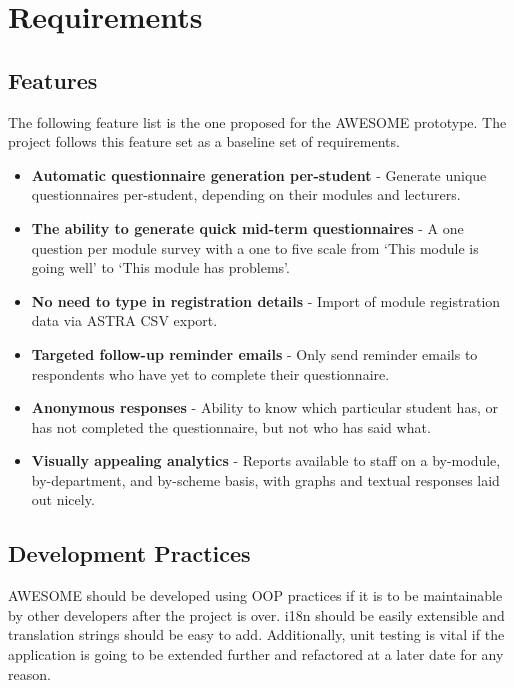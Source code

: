 \chapter{Requirements}

	\section{Features}
	
	The following feature list is the one proposed for the \ac{AWESOME} prototype.
	The project follows this feature set as a baseline set of requirements.
	
	\begin{itemize}
		\item \textbf{Automatic questionnaire generation per-student} - Generate unique questionnaires per-student, depending on their modules and lecturers.
		\item \textbf{The ability to generate quick mid-term questionnaires} - A one question per module survey with a one to five scale from `This module is going well' to `This module has problems'.
		\item \textbf{No need to type in registration details} - Import of module registration data via \ac{ASTRA} \ac{CSV} export.
		\item \textbf{Targeted follow-up reminder emails} - Only send reminder emails to respondents who have yet to complete their questionnaire.
		\item \textbf{Anonymous responses} - Ability to know which particular student has, or has not completed the questionnaire, but not who has said what.
		\item \textbf{Visually appealing analytics} - Reports available to staff on a by-module, by-department, and by-scheme basis, with graphs and textual responses laid out nicely.
	\end{itemize}

	\section{Development Practices}
	
	\ac{AWESOME} should be developed using \ac{OOP} practices if it is to be maintainable by other developers after the project is over.
	\acl{i18n} should be easily extensible and translation strings should be easy to add.
	Additionally, unit testing is vital if the application is going to be extended further and refactored at a later date for any reason.
	
